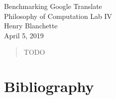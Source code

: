 \documentclass{article}
\begin{document}
\begin{center}{\huge   Benchmarking Google Translate }\\[0.4cm]{\large  Philosophy of Computation Lab IV }\\[0.75cm]{\large  Henry Blanchette }\\[0.5cm]{\large  April 5, 2019 }\\[1.0cm]\begin{abstract}
    TODO
\end{abstract}\end{center} 



\section*{Bibliography}
\end{document}
